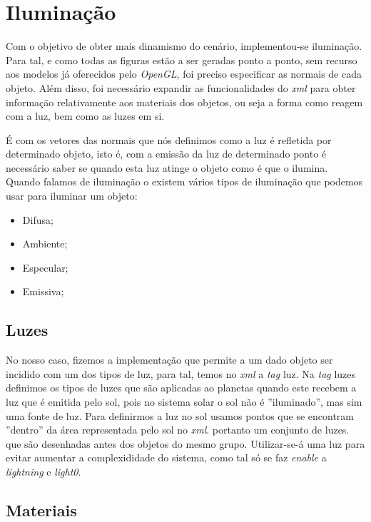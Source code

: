\chapter{Iluminação}

Com o objetivo de obter mais dinamismo do cenário, implementou-se iluminação. Para tal, e como todas as figuras estão a ser geradas ponto a ponto, sem recurso aos modelos já oferecidos pelo \textit{OpenGL}, foi preciso especificar as normais de cada objeto. Além disso, foi necessário expandir as funcionalidades do \textit{xml} para obter informação relativamente aos materiais dos objetos, ou seja a forma como reagem com a luz, bem como as luzes em si.

É com os vetores das normais que nós definimos como  a luz é refletida por determinado objeto, isto é, com a emissão da luz de determinado ponto é necessário saber se quando esta luz atinge o objeto como é que o ilumina.
Quando falamos de iluminação o existem vários tipos de iluminação que podemos usar para iluminar um objeto:

\begin{itemize}
	\item Difusa;
	\item Ambiente;
	\item Especular;
	\item Emissiva;
\end{itemize}


\section{Luzes }

No nosso caso, fizemos a implementação que permite a um dado objeto ser incidido com um dos tipos de luz, para tal, temos no \textit{xml} a \textit{tag} luz.
Na \textit{tag} luzes definimos os tipos de luzes que são aplicadas ao planetas quando este recebem a luz que é emitida pelo sol, pois no sistema solar o sol não é ”iluminado”, mas sim uma fonte de luz. Para definirmos a luz no sol usamos pontos que se encontram ”dentro” da área representada pelo sol no \textit{xml}.
portanto um conjunto de luzes. que são desenhadas antes dos objetos do mesmo grupo. Utilizar-se-á uma luz para evitar aumentar a complexididade do sistema, como tal só se faz \textit{enable} a \textit{lightning} e \textit{light0}.


\section{Materiais}

